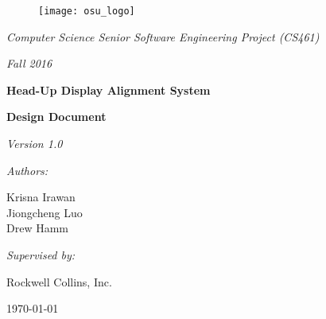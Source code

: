 \documentclass[letterpaper,10pt,onecolumn]{IEEEtran}
\def\name{Krisna Irawan\\ Jiongcheng Luo\\ Drew Hamm}
\def\doc{Design Document}
\def\version{Version 1.0}
\begin{document}
\begin{titlepage}
	\centering
	\begin{figure}
		\centering
	      	\texttt{[image: osu\_logo]}
	\end{figure}
	{\Large\itshape Computer Science Senior Software Engineering Project (CS461)\par}
	{\Large\itshape Fall 2016\par}
	\vspace{1cm}
	{\huge\bfseries Head-Up Display Alignment System\par}
	\vspace{5mm}
	{\huge\bfseries \doc\par}
	\vspace{5mm}
	{\large\itshape \version\par}
	\vspace{1cm}
	{\large\itshape Authors:\par}
	{\large \name\par}
	\vspace{1cm}
	{\large\itshape Supervised by:\par}
	{\large Rockwell Collins, Inc.\par}
	\vspace{3cm}


	\begin{abstract}
		A Head-up Display (HUD) Alignment system is developed as a proof of concept aims to explore a potential technological innovation for the HUD system that presents critical flight information to pilots. The primary objective of this project is to reduce the cost and time required to precisely align flight information to the HUD by introducing an additional sensor component to the system to make the alignment process more dynamic. This document is intended for use by Rockwell Collins and their HUD system development team. This document provides and explains an overall system framework, design viewpoints and specific design description for each viewpoint within the system.
	\end{abstract}
	\vfill
	{\normalsize \today\par}

\end{titlepage}
\tableofcontents

\newpage
\end{document}
